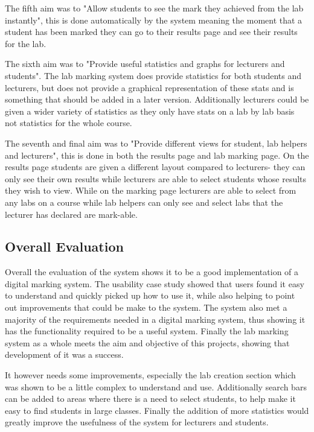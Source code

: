 \documentclass[12pt]{article}  %
\begin{document}
The fifth aim was to "Allow students to see the mark they achieved from the lab instantly", this is done automatically by the system meaning the moment that a student has been marked they can go to their results page and see their results for the lab.

The sixth aim was to "Provide useful statistics and graphs for lecturers and students". The lab marking system does provide statistics for both students and lecturers, but does not provide a graphical representation of these stats and is something that should be added in a later version. Additionally lecturers could be given a wider variety of statistics as they only have stats on a lab by lab basis not statistics for the whole course.

The seventh and final aim was to "Provide different views for student, lab helpers and lecturers", this is done in both the results page and lab marking page. On the results page students are given a different layout compared to lecturers- they can only see their own results while lecturers are able to select students whose results they wish to view. While on the marking page lecturers are able to select from any labs on a course while lab helpers can only see and select labs that the lecturer has declared are mark-able.



\subsection{Overall Evaluation}

Overall the evaluation of the system shows it to be a good implementation of a digital marking system. The usability case study showed that users found it easy to understand and quickly picked up how to use it, while also helping to point out improvements that could be make to the system. The system also met a majority of the requirements needed in a digital marking system, thus showing it has the functionality required to be a useful system. Finally the lab marking system as a whole meets the aim and objective of this projects, showing that development of it was a success.

It however needs some improvements, especially the lab creation section which was shown to be a little complex to understand and use. Additionally search bars can be added to areas where there is a need to select students, to help make it easy to find students in large classes. Finally the addition of more statistics would greatly improve the usefulness of the system for lecturers and students.
\end{document}
